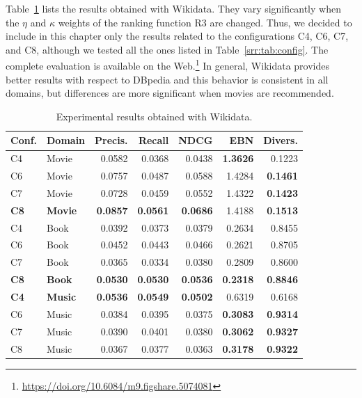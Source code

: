 Table~\ref{srr:tab:ex1-wd} lists the results obtained with Wikidata. They vary significantly when the $\eta$ and $\kappa$ weights of the ranking function R3 are changed. Thus, we decided to include in this chapter only the results related to the configurations C4, C6, C7, and C8, although we tested all the ones listed in Table~\ref{srr:tab:config}. The complete evaluation is available on the Web.\footnote{\url{https://doi.org/10.6084/m9.figshare.5074081}} In general, Wikidata provides better results with respect to DBpedia and this behavior is consistent in all domains, but differences are more significant when movies are recommended.

\begin{table}
\centering
\begin{tabular}{@{}llrrrrr@{}}
\toprule
Conf. & Domain  & Precis. & Recall & NDCG   & EBN    & Divers. \\ \midrule
C4    & Movie   & 0.0582  & 0.0368 & 0.0438 & \textbf{1.3626} & 0.1223 \\
C6    & Movie   & 0.0757  & 0.0487 & 0.0588 & 1.4284 & \textbf{0.1461} \\
C7    & Movie   & 0.0728  & 0.0459 & 0.0552 & 1.4322 & \textbf{0.1423} \\
\textbf{C8} & \textbf{Movie} & \textbf{0.0857} & \textbf{0.0561} & \textbf{0.0686} & 1.4188 & \textbf{0.1513} \\
\midrule
C4    & Book   & 0.0392   & 0.0373 & 0.0379 & 0.2634 & 0.8455  \\
C6    & Book   & 0.0452   & 0.0443 & 0.0466 & 0.2621 & 0.8705  \\
C7    & Book   & 0.0365   & 0.0334 & 0.0380 & 0.2809 & 0.8600  \\
\textbf{C8} & \textbf{Book}  & \textbf{0.0530} & \textbf{0.0530} & \textbf{0.0536} & \textbf{0.2318} & \textbf{0.8846} \\
\midrule
\textbf{C4} & \textbf{Music} & \textbf{0.0536} & \textbf{0.0549} & \textbf{0.0502} & 0.6319 & 0.6168 \\
C6    & Music  & 0.0384   & 0.0395 & 0.0375 & \textbf{0.3083} & \textbf{0.9314} \\
C7    & Music  & 0.0390   & 0.0401 & 0.0380 & \textbf{0.3062} & \textbf{0.9327} \\
C8    & Music  & 0.0367   & 0.0377 & 0.0363 & \textbf{0.3178} & \textbf{0.9322} \\ \bottomrule
\end{tabular}
\caption[Experimental results with Wikidata]{Experimental results obtained with Wikidata.}
\label{srr:tab:ex1-wd}
\end{table}

